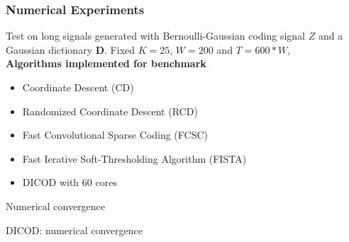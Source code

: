 \documentclass{beamer}
\def\keypoint#1{\hspace{0pt plus 1 filll}\textcolor{gray}{#1}}
\def\mycite#1{\keypoint{\small\citep{#1}}}
\begin{document}
\begin{frame}
\frametitle{Numerical Experiments}



Test on long signals generated with Bernoulli-Gaussian
coding signal $Z$ and a Gaussian dictionary $\pmb D$.
Fixed $K = 25$, $W = 200$ and $T = 600*W$,\\[1em]

\textbf{Algorithms implemented for benchmark}
\begin{itemize}
    \item {\color{cd} Coordinate Descent} (CD) \\\mycite{Kavukcuoglu2013}
    \item {\color{rcd} Randomized Coordinate Descent} (RCD) \\\mycite{Nesterov2010}
    \item Fast Convolutional Sparse Coding (FCSC)\\\mycite{Bristow2013}
    \item {\color{fista}Fast Ierative Soft-Thresholding Algorithm (FISTA)} \\\mycite{Chalasani2013, Wohlberg2016}
    \item {\color{dicod} DICOD with $60$ cores}
\end{itemize}
\end{frame}


\begin{frame}{Numerical convergence}

\centering
{}
\end{frame}



\begin{frame}{DICOD: numerical convergence}
\end{frame}
\end{document}
